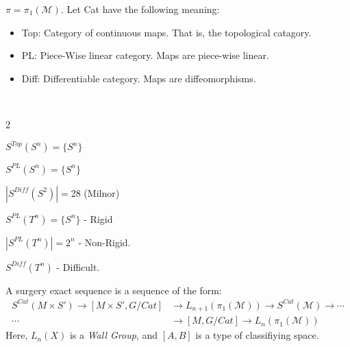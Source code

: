 \documentclass[crop=false,class=book,oneside]{standalone}
\begin{document}
                $\pi=\pi_{1}(\mathcal{M})$.
                Let Cat have the following meaning:
                \begin{itemize}
                    \item Top: Category of continuous maps.
                          That is, the topological catagory.
                    \item PL: Piece-Wise linear category.
                          Maps are piece-wise linear.
                    \item Diff: Differentiable category.
                          Maps are diffeomorphisms.
                \end{itemize}
                \begin{example}
                    \
                    \begin{enumerate}
                    \end{enumerate}
                \end{example}
                A surgery exact sequence is a sequence of the form:
                \begin{align*}
                    S^{Cat}(M\times S')\rightarrow[M\times S',G/Cat]
                    &\rightarrow L_{n+1}(\pi_{1}(\mathcal{M}))
                    \rightarrow{S^{Cat}}(\mathcal{M})
                    \rightarrow\cdots\\
                    \cdots
                    &\rightarrow{[M,G/Cat]}
                    \rightarrow{L_{n}}(\pi_{1}(\mathcal{M}))
                \end{align*}
                Here, $L_{n}(X)$ is a \textit{Wall Group},
                and $[A,B]$ is a type of classifiying space.
\end{document}
